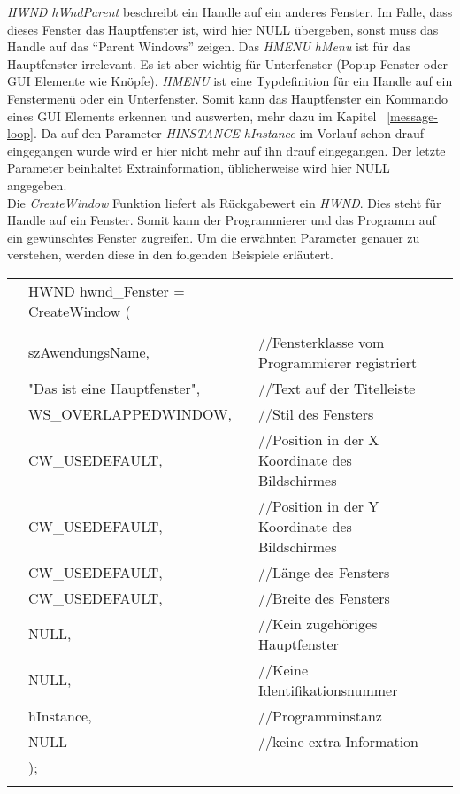 \textit{HWND hWndParent} beschreibt ein Handle auf ein anderes Fenster. Im Falle, dass dieses Fenster das Hauptfenster ist, wird hier NULL übergeben, sonst muss das Handle auf das "`Parent Windows"' zeigen. Das \textit{HMENU hMenu} ist für das Hauptfenster irrelevant. Es ist aber wichtig für Unterfenster (Popup Fenster oder GUI Elemente wie Knöpfe). \textit{HMENU} ist eine Typdefinition für ein Handle auf ein Fenstermenü oder ein Unterfenster. Somit kann das Hauptfenster ein Kommando eines GUI Elements erkennen und auswerten, mehr dazu im Kapitel ~\ref{message-loop}. Da auf den Parameter \textit{HINSTANCE hInstance} im Vorlauf schon drauf eingegangen wurde wird er hier nicht mehr auf ihn drauf eingegangen. Der letzte Parameter beinhaltet Extrainformation, üblicherweise wird hier NULL angegeben.\\

Die \textit{CreateWindow} Funktion liefert als Rückgabewert ein \textit{HWND}. Dies steht für Handle auf ein Fenster. Somit kann der Programmierer und das Programm auf ein gewünschtes Fenster zugreifen. Um die erwähnten Parameter genauer zu verstehen, werden diese in den folgenden Beispiele erläutert.\\

\begin{tabular}{llll}
& HWND hwnd\_Fenster = CreateWindow (\\
\\
& szAwendungsName,					& //Fensterklasse vom Programmierer registriert\\                            
& "Das ist eine Hauptfenster",  	    & //Text auf der Titelleiste\\                                
& WS\_OVERLAPPEDWINDOW,              & //Stil des Fensters\\                         
& CW\_USEDEFAULT,                    & //Position in der X Koordinate des Bildschirmes\\     
& CW\_USEDEFAULT,                    & //Position in der Y Koordinate des Bildschirmes\\     
& CW\_USEDEFAULT,                    & //Länge des Fensters\\                                  
& CW\_USEDEFAULT,                    & //Breite des Fensters\\                                 
& NULL,                              & //Kein zugehöriges Hauptfenster\\                           
& NULL,                              & //Keine Identifikationsnummer\\                               
& hInstance,                         & //Programminstanz\\                                 
& NULL                               & //keine extra Information\\  
& );\\\\                 
\end{tabular} 

